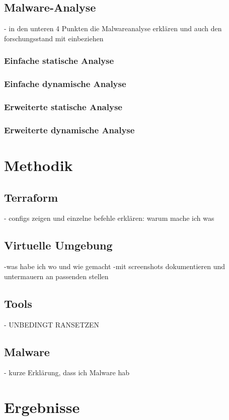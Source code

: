 \documentclass[12pt,oneside]{article}
\begin{document}
\subsection{Malware-Analyse}
- in den unteren 4 Punkten die Malwareanalyse erklären und auch den forschungsstand mit einbeziehen
\subsubsection{Einfache statische Analyse}
\subsubsection{Einfache dynamische Analyse}
\subsubsection{Erweiterte statische Analyse}
\subsubsection{Erweiterte dynamische Analyse}
\newpage

\section{Methodik}
\subsection{Terraform}
- configs zeigen und einzelne befehle erklären: warum mache ich was
\subsection{Virtuelle Umgebung}
-was habe ich wo und wie gemacht
\newline
-mit screenshots dokumentieren und untermauern an passenden stellen
\subsection{Tools}
- UNBEDINGT RANSETZEN
\subsection{Malware}
- kurze Erklärung, dass ich Malware hab
\newpage

\section{Ergebnisse}
\newpage
\end{document}
